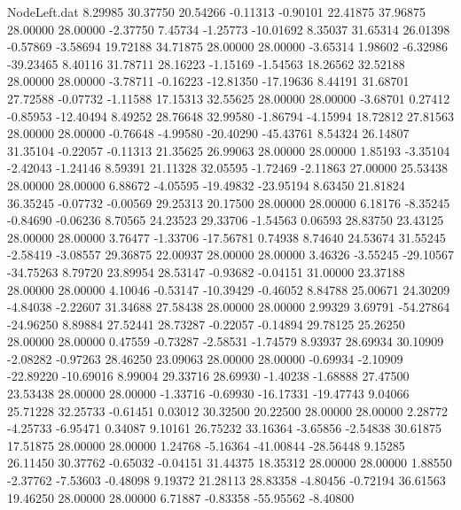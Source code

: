 \begin{filecontents}{NodeLeft.dat}
   8.29985   30.37750   20.54266    -0.11313   -0.90101   22.41875   37.96875   28.00000   28.00000   -2.37750    7.45734   -1.25773  -10.01692
   8.35037   31.65314   26.01398    -0.57869   -3.58694   19.72188   34.71875   28.00000   28.00000   -3.65314    1.98602   -6.32986  -39.23465
   8.40116   31.78711   28.16223    -1.15169   -1.54563   18.26562   32.52188   28.00000   28.00000   -3.78711   -0.16223  -12.81350  -17.19636
   8.44191   31.68701   27.72588    -0.07732   -1.11588   17.15313   32.55625   28.00000   28.00000   -3.68701    0.27412   -0.85953  -12.40494
   8.49252   28.76648   32.99580    -1.86794   -4.15994   18.72812   27.81563   28.00000   28.00000   -0.76648   -4.99580  -20.40290  -45.43761
   8.54324   26.14807   31.35104    -0.22057   -0.11313   21.35625   26.99063   28.00000   28.00000    1.85193   -3.35104   -2.42043   -1.24146
   8.59391   21.11328   32.05595    -1.72469   -2.11863   27.00000   25.53438   28.00000   28.00000    6.88672   -4.05595  -19.49832  -23.95194
   8.63450   21.81824   36.35245    -0.07732   -0.00569   29.25313   20.17500   28.00000   28.00000    6.18176   -8.35245   -0.84690   -0.06236
   8.70565   24.23523   29.33706    -1.54563    0.06593   28.83750   23.43125   28.00000   28.00000    3.76477   -1.33706  -17.56781    0.74938
   8.74640   24.53674   31.55245    -2.58419   -3.08557   29.36875   22.00937   28.00000   28.00000    3.46326   -3.55245  -29.10567  -34.75263
   8.79720   23.89954   28.53147    -0.93682   -0.04151   31.00000   23.37188   28.00000   28.00000    4.10046   -0.53147  -10.39429   -0.46052
   8.84788   25.00671   24.30209    -4.84038   -2.22607   31.34688   27.58438   28.00000   28.00000    2.99329    3.69791  -54.27864  -24.96250
   8.89884   27.52441   28.73287    -0.22057   -0.14894   29.78125   25.26250   28.00000   28.00000    0.47559   -0.73287   -2.58531   -1.74579
   8.93937   28.69934   30.10909    -2.08282   -0.97263   28.46250   23.09063   28.00000   28.00000   -0.69934   -2.10909  -22.89220  -10.69016
   8.99004   29.33716   28.69930    -1.40238   -1.68888   27.47500   23.53438   28.00000   28.00000   -1.33716   -0.69930  -16.17331  -19.47743
   9.04066   25.71228   32.25733    -0.61451    0.03012   30.32500   20.22500   28.00000   28.00000    2.28772   -4.25733   -6.95471    0.34087
   9.10161   26.75232   33.16364    -3.65856   -2.54838   30.61875   17.51875   28.00000   28.00000    1.24768   -5.16364  -41.00844  -28.56448
   9.15285   26.11450   30.37762    -0.65032   -0.04151   31.44375   18.35312   28.00000   28.00000    1.88550   -2.37762   -7.53603   -0.48098
   9.19372   21.28113   28.83358    -4.80456   -0.72194   36.61563   19.46250   28.00000   28.00000    6.71887   -0.83358  -55.95562   -8.40800

\end{filecontents}

